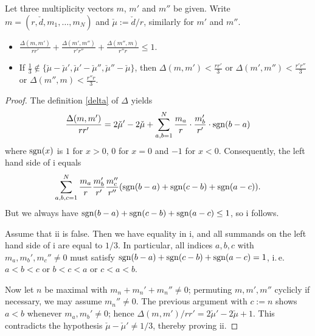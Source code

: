 \documentclass{article}
\begin{document}
\begin{lemma} \label{bound}
  Let three multiplicity vectors $m$, $m'$ and $m''$ be given. Write $m = (r, \check{d}, m_1, \ldots, m_N)$ and $\check{\mu} := \check{d}/r$, similarly
  for $m'$ and $m''$.
  \begin{itemize}
   \item[i)] $\frac{\Delta( m, m')}{r r'} + \frac{\Delta( m', m'')}{r' r''} + \frac{\Delta( m'', m)}{r'' r} \leq 1$.
   \item[ii)] If $\frac{1}{3} \not\in \{ \check{\mu} - \check{\mu}', \check{\mu}' - \check{\mu}'', \check{\mu}'' - \check{\mu} \}$, then
    $\Delta(m, m') < \frac{r r'}{3}$ or $\Delta(m', m'') < \frac{r' r''}{3}$ or $\Delta(m'', m) < \frac{r'' r}{3}$.
  \end{itemize}
\end{lemma}
\begin{proof}
  The definition \ref{delta} of $\Delta$ yields
  \begin{displaymath}
    \frac{\Delta( m, m')}{r r'} = 2 \check{\mu}' - 2 \check{\mu} + \sum_{a, b = 1}^N \frac{m_a}{r} \cdot \frac{m_b'}{r'} \cdot \mathrm{sgn}(b-a)
  \end{displaymath}
  where $\mathrm{sgn}(x)$ is $1$ for $x>0$, $0$ for $x=0$ and $-1$ for $x<0$. Consequently, the left hand side of i equals
  \begin{displaymath}
    \sum_{a, b, c = 1}^N \frac{m_a}{r} \frac{m_b'}{r'} \frac{m_c''}{r''} (\mathrm{sgn}(b-a) + \mathrm{sgn}(c-b) + \mathrm{sgn}(a-c)).
  \end{displaymath}
  But we always have $\mathrm{sgn}(b-a) + \mathrm{sgn}(c-b) + \mathrm{sgn}(a-c) \leq 1$, so i follows.

  Assume that ii is false. Then we have equality in i, and all summands on the left hand side of i are equal to $1/3$. In particular, all indices
  $a, b, c$ with $m_a, m_b', m_c'' \neq 0$ must satisfy $\mathrm{sgn}(b-a) + \mathrm{sgn}(c-b) + \mathrm{sgn}(a-c) = 1$, i.\,e. $a<b<c$ or $b<c<a$ or $c<a<b$.

  Now let $n$ be maximal with $m_n + m_n' + m_n'' \neq 0$; permuting $m, m', m''$ cyclicly if necessary, we may assume $m_n'' \neq 0$. The previous
  argument with $c := n$ shows $a<b$ whenever $m_a, m_b' \neq 0$; hence $\Delta( m, m')/r r' = 2 \check{\mu}' - 2 \check{\mu} + 1$. This contradicts
  the hypothesis $\check{\mu} - \check{\mu}' \neq 1/3$, thereby proving ii.
\end{proof}
\end{document}
